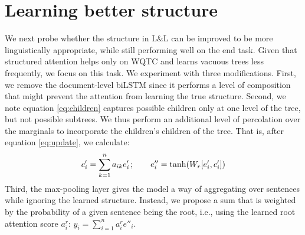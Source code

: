 \section{Learning better structure} We next probe whether the structure in L\&L can be improved to be more linguistically appropriate, while still performing well on the end task. Given that structured attention helps only on WQTC and learns vacuous trees less frequently, we focus on this task. We experiment with three modifications. First, we remove the document-level biLSTM since it performs a level of composition that might prevent the attention from learning the true structure. Second, we note equation \ref{eq:children} captures possible children only at one level of the tree, but not possible subtrees. We thus perform an additional level of percolation over the marginals to incorporate the children's children of the tree. That is, after equation \ref{eq:update}, we calculate:
\vspace{-0.5em}
\begin{equation}
c'_i = \sum^{n}_{k=1}a_{ik}e'_{i}\hspace{1pt};\hspace{20pt}e''_i = \tanh(W_r[e'_i, c'_i])
\vspace{-0.3em}
\end{equation}
Third, the max-pooling layer gives the model a way of aggregating over sentences while ignoring the learned structure. Instead, we propose a sum that is weighted by the probability of a given sentence being the root, i.e., using the learned root attention score $a_i^r$: $y_i=\sum_{i=1}^n a_i^r e''_i$.

\begin{table}[t]
\centering
\small
{}
\vspace{-0.7em}
\caption{Mean test accuracy and tree statistics on the WQTC dev set (averaged across four runs).  -biLSTM removes the document-level biLSTM, +w uses the weighted sum, +p performs 1 extra percolation, and +4p does 4 levels of percolation. The last row are (`gold') parsed RST discourse dependency trees.}
\label{tab:results_deeper}
\end{table}


